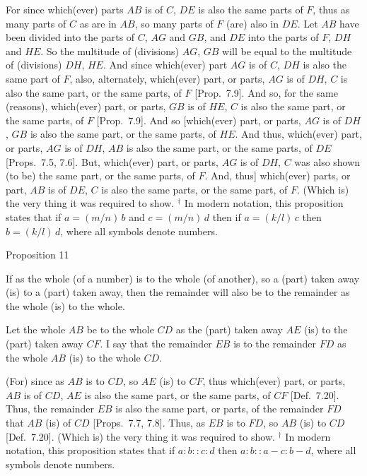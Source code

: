 For since which(ever) parts $AB$ is of $C$, $DE$ is also the same parts of $F$,
thus as many parts of $C$ as are in $AB$, so many parts of $F$ (are)
also in $DE$. Let $AB$ have been divided into the parts of $C$, $AG$ and $GB$, and
$DE$ into the parts of $F$, $DH$ and $HE$.  So the multitude of
(divisions) $AG$, $GB$ will be equal to the multitude of (divisions) $DH$, $HE$.
And since which(ever) part $AG$ is of $C$, $DH$ is also the same part of $F$,
also, alternately, which(ever) part, or parts, $AG$ is
of $DH$, $C$ is also the same part, or the same parts, of $F$  [Prop.~7.9]. And so, for the same (reasons), 
which(ever) part, or parts, $GB$ is of $HE$, $C$ is also the same
part, or the same parts, of $F$ [Prop.~7.9]. And so [which(ever) part, or parts, $AG$ is of
$DH$, $GB$ is also the same part, or the same parts, of $HE$. And thus,
which(ever) part, or parts, $AG$ is of $DH$, $AB$ is also the same part, or the
same parts, of $DE$ [Props.~7.5, 7.6]. But, which(ever) part, or parts, $AG$ is of $DH$, $C$ was also
shown (to be) the same part, or the same parts, of $F$. And, thus] which(ever)
parts, or part, $AB$ is of $DE$, $C$ is also the  same parts, or the same part, of $F$. (Which
is) the very thing it was required to show.
{\footnotesize\noindent$^\dag$ In modern notation, this
proposition states that if $a=(m/n)\,b$ and $c=(m/n)\,d$ then if $a=(k/l)\,c$
then $b = (k/l)\,d$, where all symbols denote numbers.}


\begin{center}
{\large Proposition 11}
\end{center}

If as the whole (of a number) is to the whole (of
another), so
a (part) taken away (is) to a (part) taken away, then the remainder will also
be to the
remainder as the whole (is) to the whole.

Let the whole $AB$ be to the whole  $CD$ as the (part) taken
away $AE$ (is) to the (part) taken away $CF$. I say that the remainder
$EB$ is to the remainder $FD$ as the whole $AB$ (is) to the whole $CD$.

\epsfysize=2in
\centerline{}

(For) since as $AB$ is to $CD$, so $AE$ (is) to $CF$, thus which(ever) part, or parts,
$AB$ is of $CD$, $AE$ is also the same part, or the same parts, of $CF$ [Def.~7.20]. Thus, the remainder $EB$ is also the same
part, or parts, of the remainder $FD$ that $AB$ (is) of $CD$ [Props.~7.7, 7.8]. Thus, as $EB$ is to $FD$, so $AB$ (is) to $CD$ [Def.~7.20].
(Which is) the very thing it was required to show.
{\footnotesize\noindent$^\dag$ In modern notation, this
proposition states that if $a:b::c:d$ then $a:b::a-c:b-d$, where all
symbols denote numbers.}

